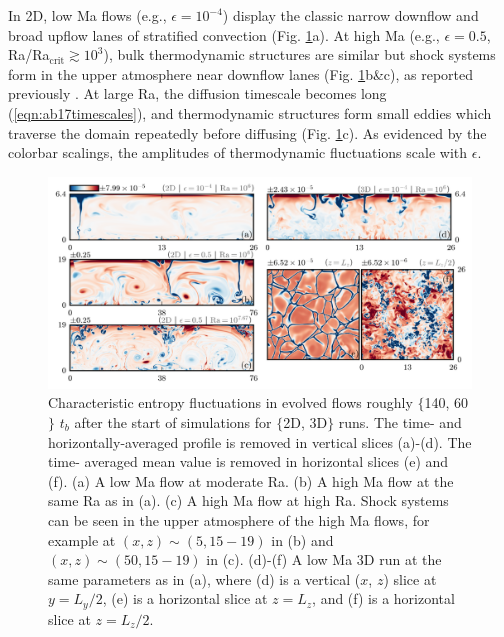 In 2D, low Ma flows (e.g., $\epsilon = 10^{-4}$) display the classic narrow downflow and broad upflow lanes of stratified convection (Fig. \ref{fig:entropy_snapshots}a).
At high Ma (e.g., $\epsilon = 0.5$, Ra/Ra$_{\text{crit}} \gtrsim 10^3$), bulk thermodynamic structures are similar but shock systems form in the upper atmosphere near downflow lanes (Fig. \ref{fig:entropy_snapshots}b\&c), as reported previously \citep{cattaneo&all1990, malagoli&all1990}.
At large Ra, the diffusion timescale becomes long (\ref{eqn:ab17timescales}), and thermodynamic structures form small eddies which traverse the domain repeatedly before diffusing (Fig. \ref{fig:entropy_snapshots}c).
As evidenced by the colorbar scalings, the amplitudes of thermodynamic fluctuations scale with $\epsilon$.

\begin{figure}[t!]
\includegraphics[width=\textwidth]{./figs/snapshots_fig_raster.pdf}
\caption[Flow morphology of 2D, 3D, and low and high Mach number flows.]
{
	Characteristic entropy fluctuations in evolved flows roughly $\{$140, 60$\}$ $t_b$ after the start of simulations for $\{$2D, 3D$\}$ runs. 
	The time- and horizontally-averaged profile is removed in vertical slices (a)-(d). 
	The time- averaged mean value is removed in horizontal slices (e) and (f).
	(a) A low Ma flow at moderate Ra. 
	(b) A high Ma flow at the same Ra as in (a).
	(c) A high Ma flow at high Ra. 
	Shock systems can be seen in the upper atmosphere of the high Ma flows, for example at $(x, z) \sim (5, 15-19)$ in (b) and $(x, z) \sim (50, 15-19)$ in (c).
	(d)-(f) A low Ma 3D run at the same parameters as in (a), where (d) is a vertical ($x$, $z$) slice at $y = L_y/2$, (e) is a horizontal slice at $z = L_z$, and (f) is a horizontal slice at $z = L_z/2$.
	\label{fig:entropy_snapshots} 
}
\end{figure}



